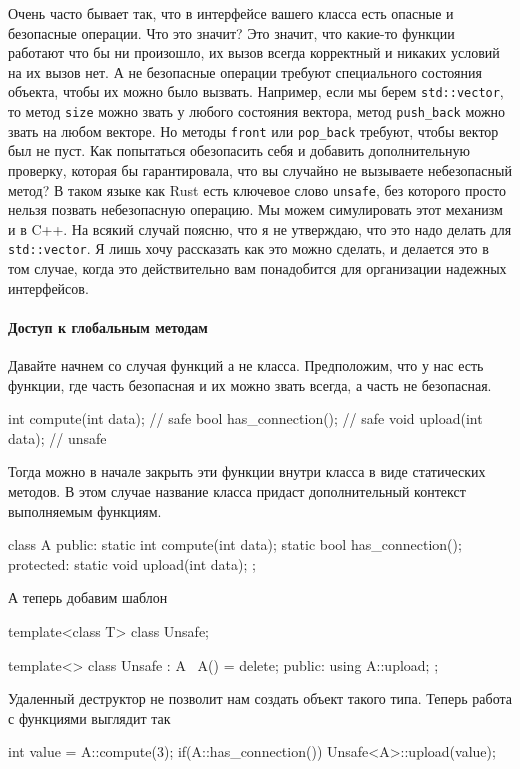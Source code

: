 Очень часто бывает так, что в интерфейсе вашего класса есть опасные и безопасные операции.
Что это значит?
Это значит, что какие-то функции работают что бы ни произошло, их вызов всегда корректный и никаких условий на их вызов нет.
А не безопасные операции требуют специального состояния объекта, чтобы их можно было вызвать.
Например, если мы берем \verb"std::vector", то метод \verb"size" можно звать у любого состояния вектора, метод \verb"push_back" можно звать на любом векторе.
Но методы \verb"front" или \verb"pop_back" требуют, чтобы вектор был не пуст.
Как попытаться обезопасить себя и добавить дополнительную проверку, которая бы гарантировала, что вы случайно не вызываете небезопасный метод?
В таком языке как Rust есть ключевое слово \verb"unsafe", без которого просто нельзя позвать небезопасную операцию.
Мы можем симулировать этот механизм и в C++.
На всякий случай поясню, что я не утверждаю, что это надо делать для \verb"std::vector".
Я лишь хочу рассказать как это можно сделать, и делается это в том случае, когда это действительно вам понадобится для организации надежных интерфейсов.

\paragraph{Доступ к глобальным методам}

Давайте начнем со случая функций а не класса.
Предположим, что у нас есть функции, где часть безопасная и их можно звать всегда, а часть не безопасная.
\begin{cppcode}
int compute(int data); // safe
bool has_connection(); // safe
void upload(int data); // unsafe
\end{cppcode}
Тогда можно в начале закрыть эти функции внутри класса в виде статических методов.
В этом случае название класса придаст дополнительный контекст выполняемым функциям.
\begin{cppcode}
class A {
public:
  static int compute(int data);
  static bool has_connection();
protected:
  static void upload(int data);
};
\end{cppcode}
А теперь добавим шаблон
\begin{cppcode}
template<class T>
class Unsafe;

template<>
class Unsafe : A {
  ~A() = delete;
public:
  using A::upload;
};
\end{cppcode}
Удаленный деструктор не позволит нам создать объект такого типа.
Теперь работа с функциями выглядит так
\begin{cppcode}
int value = A::compute(3);
if(A::has_connection())
  Unsafe<A>::upload(value);
\end{cppcode}

